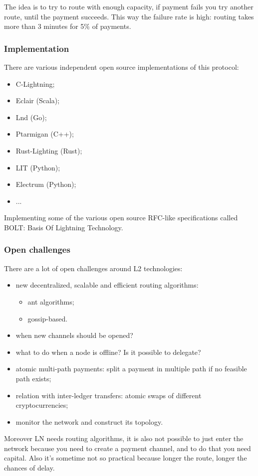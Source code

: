 The idea is to try to route with enough capacity, if payment fails you try another route, until the payment succeeds.
This way the failure rate is high: routing takes more than 3 minutes for 5\% of payments.

\subsubsection{Implementation}
There are various independent open source implementations of this protocol:
\begin{itemize}
    \item C-Lightning;
    \item Eclair (Scala);
    \item Lnd (Go);
    \item Ptarmigan (C++);
    \item Rust-Lighting (Rust);
    \item LIT (Python);
    \item Electrum (Python);
    \item ...
\end{itemize}

Implementing some of the various open source RFC-like specifications called BOLT: Basis Of Lightning Technology.

\subsubsection{Open challenges}
There are a lot of open challenges around L2 technologies:
\begin{itemize}
    \item new decentralized, scalable and efficient routing algorithms:
    \begin{itemize}
        \item ant algorithms;
        \item gossip-based.
    \end{itemize}
    \item when new channels should be opened?
    \item what to do when a node is offline? Is it possible to delegate?
    \item atomic multi-path payments: split a payment in multiple path if no feasible path exists;
    \item relation with inter-ledger transfers: atomic swaps of different cryptocurrencies;
    \item monitor the network and construct its topology.
\end{itemize}

Moreover LN needs routing algorithms, it is also not possible to just enter the network because you need to create a payment channel, and to do that you need capital.
Also it's sometime not so practical because longer the route, longer the chances of delay.


